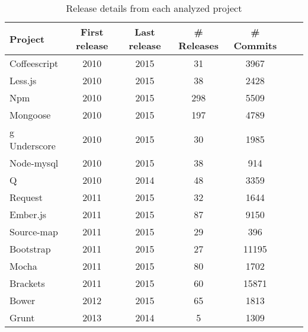 \begin{table}[!hbt]
    \begin{center}
        \caption{Release details from each analyzed project}
        \label{tab:release_details}
        \begin{tabular}{l| c c c c c c}
            \toprule
            \textbf{Project} & \textbf{First release} & \textbf{Last release}  & \textbf{\# Releases} & \textbf{\# Commits} \\ \midrule
             Coffeescript & 2010    & 2015  &    31 &      3967 \\
             Less.js      & 2010    & 2015  &    38 &      2428 \\
             Npm          & 2010    & 2015  &   298 &      5509 \\
             Mongoose     & 2010    & 2015  &   197 &      4789 \\g
             Underscore   & 2010    & 2015  &    30 &      1985 \\
             Node-mysql   & 2010    & 2015  &    38 &       914 \\
             Q            & 2010    & 2014  &    48 &      3359 \\
             Request      & 2011    & 2015  &    32 &      1644 \\
             Ember.js     & 2011    & 2015  &    87 &      9150 \\
             Source-map   & 2011    & 2015  &    29 &       396 \\
             Bootstrap    & 2011    & 2015  &    27 &     11195 \\
             Mocha        & 2011    & 2015  &    80 &      1702 \\
             Brackets     & 2011    & 2015  &    60 &     15871 \\
             Bower        & 2012    & 2015  &    65 &      1813 \\
             Grunt        & 2013    & 2014  &     5 &      1309 \\ \bottomrule
        \end{tabular}
    \end{center}
\end{table}

